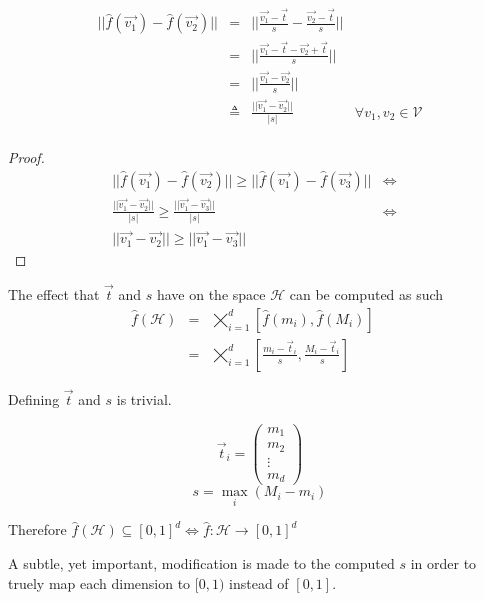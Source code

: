 \documentclass{juliacon}
\begin{document}
\begin{lemma}
  $$
  \begin{matrix}
    ||\hat{f}(\vec{v_1}) - \hat{f}(\vec{v_2})|| &=& || \frac{\vec{v_1} - \vec{t}}{s} - \frac{\vec{v_2} - \vec{t}}{s}||\\
                                                &=& || \frac{\vec{v_1} - \vec{t} - \vec{v_2} + \vec{t}}{s}||\\
                                                &=& || \frac{\vec{v_1} - \vec{v_2}}{s}||\\
                                                &\triangleq& \frac{||\vec{v_1} - \vec{v_2}||}{|s|} & \forall v_1, v_2 \in \mathcal{V}\\
  \end{matrix}
  $$
\end{lemma}
\begin{proof}
  $$
  \begin{matrix}
    ||\hat{f}(\vec{v_1}) - \hat{f}(\vec{v_2})|| \geq ||\hat{f}(\vec{v_1}) - \hat{f}(\vec{v_3})|| &\Leftrightarrow&\\
    \frac{||\vec{v_1} - \vec{v_2}||}{|s|} \geq \frac{||\vec{v_1} - \vec{v_3}||}{|s|} &\Leftrightarrow&\\
    ||\vec{v_1} - \vec{v_2}|| \geq ||\vec{v_1} - \vec{v_3}||
  \end{matrix}
  $$
$$$$
\end{proof}

The effect that $\vec{t}$ and $s$ have on the space $\mathcal{H}$ can be computed as such
$$
\begin{matrix}
  \hat{f}(\mathcal{H}) & = & \bigtimes\limits_{i=1}^d [\hat{f}(m_i), \hat{f}(M_i)] &\\
                       & = & \bigtimes\limits_{i=1}^d [\frac{m_i-\vec{t}_i}{s}, \frac{M_i-\vec{t}_i}{s}] &\
\end{matrix}
$$

Defining $\vec{t}$ and $s$ is trivial.

$$ \vec{t}_i = \begin{pmatrix} m_1 \\ m_2 \\ \vdots \\ m_d \end{pmatrix}$$
$$ s = \max_i(M_i-m_i)$$

Therefore $\hat{f}(\mathcal{H}) \subseteq [0, 1]^d \Leftrightarrow \hat{f}: \mathcal{H} \rightarrow [0,1]^d$

A subtle, yet important, modification is made to the computed $s$ in order to truely
map each dimension to $[0,1)$ instead of $[0,1]$.
\end{document}
